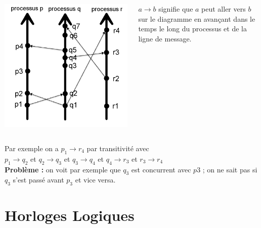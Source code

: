 \documentclass[compress]{beamer}
\begin{document}
\begin{frame}
\frametitle{}
  \begin{columns}
    \begin{column}{.5\textwidth}
    \begin{block}{}
		\includegraphics[scale=0.15]{process2.png}
    \end{block}
    \end{column}
	\begin{column}{0.5 \textwidth}
	\begin{block}{
		$a \rightarrow b$ signifie que $a$ peut aller vers $b$ sur le diagramme en avançant dans le temps le long du processus et de la ligne de message.}
		\end{block}
	\end{column}
	\end{columns}
	Par exemple on a $p_1 \rightarrow r_4$  par transitivité avec \\
	$p_1 \rightarrow q_2$ et $q_2 \rightarrow q_3$ et $q_3 \rightarrow q_4$ et $q_4 \rightarrow r_3$ et $r_3 \rightarrow r_4$\\
	\textbf{Problème : }on voit par exemple que $q_3$ est concurrent avec $p3$ ; on ne sait pas si $q_3$ s'est passé avant $p_3$ et vice versa.
\end{frame}

\section{Horloges Logiques}
\end{document}
